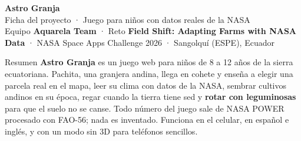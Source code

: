 \documentclass[10pt,a4paper]{article}
\newcommand{\titulo}{\bfseries}
\newcommand{\banda}[3]{%
\begin{tcolorbox}[colback=verde,colframe=oro,boxrule=0pt,bottomrule=4pt,arc=6pt,left=12pt,right=12pt,top=10pt,bottom=10pt,
  fontupper=\color{white}]
{\titulo\fontsize{26}{28}\selectfont #1}\\[2pt]
{\large #2}\\[4pt]
{\small #3}
\end{tcolorbox}}
\begin{document}
\banda{Astro Granja}{Ficha del proyecto · Juego para niños con datos reales de la NASA}%
{Equipo \textbf{Aquarela Team} · Reto \textbf{Field Shift: Adapting Farms with NASA Data} · NASA Space Apps Challenge 2026 · Sangolquí (ESPE), Ecuador}

\begin{tarjeta}{Resumen}
\textbf{Astro Granja} es un juego web para niños de 8 a 12 años de la sierra ecuatoriana. Pachita, una granjera andina, llega en cohete
y enseña a elegir una parcela real en el mapa, leer su clima con datos de la NASA, sembrar cultivos andinos en su época, regar cuando la
tierra tiene sed y \textbf{rotar con leguminosas} para que el suelo no se canse. Todo número del juego sale de NASA POWER procesado con
FAO-56; nada es inventado. Funciona en el celular, en español e inglés, y con un modo sin 3D para teléfonos sencillos.
\end{tarjeta}
\end{document}
